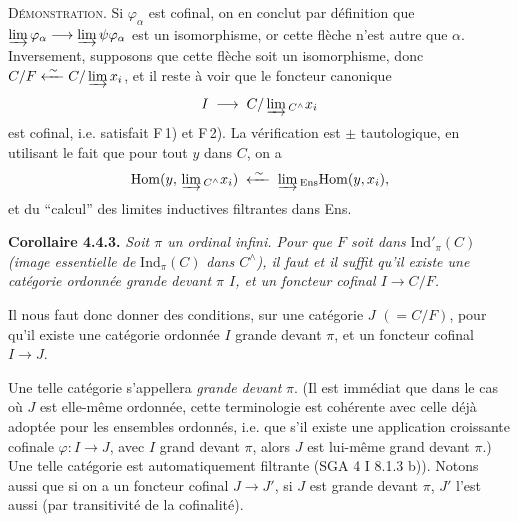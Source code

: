\documentclass[11pt]{article}
\newcommand{\printedpage}[1]{\marginpar{\footnotesize p.~#1}}
\newcommand{\msp}[1]{\marginpar{\footnotesize [#1]}}
\newcommand{\Ind}{\mathrm{Ind}}
\newcommand{\Hom}{\mathrm{Hom}}
\begin{document}
\textsc{Démonstration}. Si $\varphi_\alpha$ est cofinal, on en conclut par définition que $\varinjlim \varphi_\alpha \longrightarrow \varinjlim \psi\varphi_\alpha$ est un isomorphisme, or cette flèche n'est autre que $\alpha$. Inversement, supposons que cette flèche soit un isomorphisme, donc $C/F \xleftarrow{\;\sim\;} C/\varinjlim x_i$, et il reste à voir que le foncteur canonique
\[
I \;\longrightarrow\; C/\varinjlim{}_{C^{\wedge}} x_i
\]
est cofinal, i.e. satisfait F\,1) et F\,2). La vérification est $\pm$ tautologique, en utilisant le fait que pour tout $y$ dans $C$, on a
\[
\Hom(y,\, \varinjlim{}_{C^{\wedge}} x_i) \;\xleftarrow{\;\sim\;}\; \varinjlim{}_{\mathrm{Ens}}\Hom(y,x_i),
\]
et du “calcul” des limites inductives filtrantes dans Ens.

\textbf{Corollaire 4.4.3.} \textit{Soit $\pi$ un ordinal infini. Pour que $F$ soit dans} $\Ind'_\pi(C)$ \textit{(image essentielle de} $\Ind_\pi(C)$ \textit{dans $C^{\wedge}$), il faut et il suffit qu'il existe une catégorie ordonnée grande devant $\pi$ $I$, et un foncteur cofinal $I \longrightarrow C/F$.}

Il nous faut donc donner des conditions, sur une catégorie $J$ $(= C/F)$, pour qu'il existe une catégorie ordonnée $I$ grande devant $\pi$, et un foncteur cofinal $I \longrightarrow J$.

\msp{page 81}
Une telle catégorie s'appellera \textit{grande devant} $\pi$. (Il est immédiat que dans le cas où $J$ est elle-même ordonnée, cette terminologie est cohérente avec celle déjà adoptée pour les ensembles ordonnés, i.e. que s'il existe une application croissante cofinale $\varphi : I \longrightarrow J$, avec $I$ grand devant $\pi$, alors $J$ est lui-même grand devant $\pi$.) Une telle catégorie est
\printedpage{17}
automatiquement filtrante (SGA 4 I 8.1.3 b)). Notons aussi que si on a un foncteur cofinal $J \longrightarrow J'$, si $J$ est grande devant $\pi$, $J'$ l'est aussi (par transitivité de la cofinalité).
\end{document}
